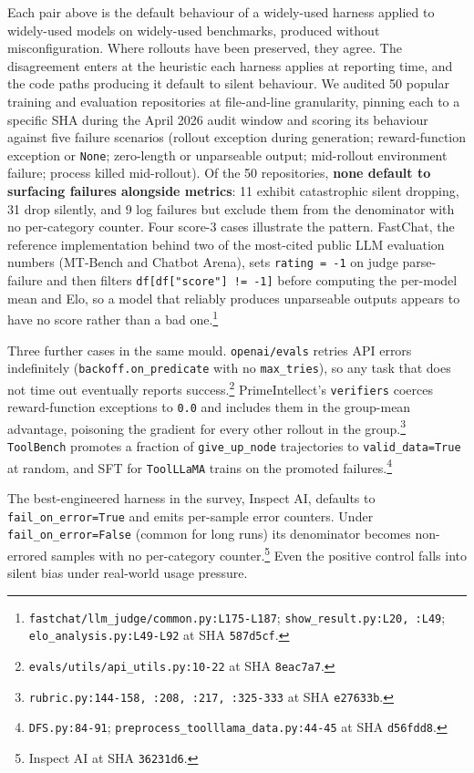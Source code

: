 \documentclass{article}
\begin{document}
Each pair above is the default behaviour of a widely-used
harness applied to widely-used models on widely-used
benchmarks, produced without misconfiguration. Where rollouts
have been preserved, they agree. The disagreement enters at
the heuristic each harness applies at reporting time, and the
code paths producing it default to silent behaviour. We audited
50 popular training and evaluation repositories at
file-and-line granularity, pinning each to a specific SHA during
the April 2026 audit window and scoring its behaviour against five failure
scenarios (rollout exception during generation;
reward-function exception or \texttt{None}; zero-length or
unparseable output; mid-rollout environment failure; process
killed mid-rollout). Of the 50 repositories, \textbf{none
default to surfacing failures alongside metrics}: 11 exhibit
catastrophic silent dropping, 31 drop silently, and 9 log
failures but exclude them from the denominator with no
per-category counter. Four score-3 cases illustrate the pattern. FastChat, the
reference implementation behind two of the most-cited public
LLM evaluation numbers (MT-Bench and Chatbot Arena), sets
\texttt{rating = -1} on judge parse-failure and then filters
\texttt{df[df["score"] != -1]} before computing the per-model
mean and Elo, so a model that reliably produces unparseable
outputs appears to have no score rather than a bad
one.\footnote{\texttt{fastchat/llm\_judge/common.py:L175-L187};
\texttt{show\_result.py:L20, :L49};
\texttt{elo\_analysis.py:L49-L92} at SHA \texttt{587d5cf}.}

Three further cases in the same mould.
\texttt{openai/evals} retries API errors indefinitely
(\texttt{backoff.on\_predicate} with no
\texttt{max\_tries}), so any task that does not time out
eventually reports
success.\footnote{\texttt{evals/utils/api\_utils.py:10-22} at
SHA \texttt{8eac7a7}.} PrimeIntellect's \texttt{verifiers}
coerces reward-function exceptions to \texttt{0.0} and
includes them in the group-mean advantage, poisoning the
gradient for every other rollout in the
group.\footnote{\texttt{rubric.py:144-158, :208, :217, :325-333}
at SHA \texttt{e27633b}.} \texttt{ToolBench} promotes a
fraction of \texttt{give\_up\_node} trajectories to
\texttt{valid\_data=True} at random, and SFT for
\texttt{ToolLLaMA} trains on the promoted
failures.\footnote{\texttt{DFS.py:84-91};
\texttt{preprocess\_toolllama\_data.py:44-45} at SHA
\texttt{d56fdd8}.}

The best-engineered harness in the survey,
Inspect AI, defaults to \texttt{fail\_on\_error=True} and
emits per-sample error counters. Under
\texttt{fail\_on\_error=False} (common for long runs) its
denominator becomes non-errored samples with no per-category
counter.\footnote{Inspect AI at SHA \texttt{36231d6}.} Even
the positive control falls into silent bias under real-world
usage pressure.
\end{document}
